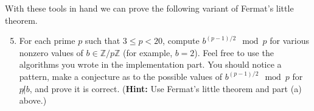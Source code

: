 \documentclass[11pt]{article}
\newcommand{\bZ}{\mathbb{Z}}
\begin{document}
\begin{enumerate}
{  With these tools in hand we can prove the following variant of Fermat's little theorem.
  \begin{enumerate}
    \setcounter{enumii}{4}
    \item{
    For each prime $p$ such that $3\le p<20$, compute $b^{(p-1)/2}\mod p$ for various nonzero values of $b\in\bZ/p\bZ$ (for example, $b=2$).  Feel free to use the algorithms you wrote in the implementation part.  You should notice a pattern, make a conjecture as to the possible values of $b^{(p-1)/2}\mod p$ for $p\not|b$, and prove it is correct.  (\textbf{Hint:} Use Fermat's little theorem and part (a) above.)
    }
  \end{enumerate}
  }
\end{enumerate}
\end{document}
